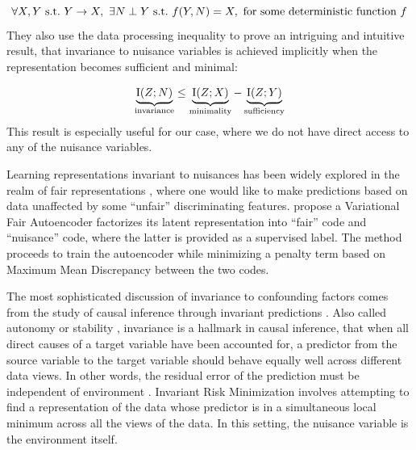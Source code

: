 \documentclass[../thesis.tex]{subfiles}
\begin{document}
\begin{equation}
    \forall \myrv{x}, \myrv{y} ~ \text{s.t.} ~ \myrv{y} \to \myrv{x}, ~ \exists \myrv{n} \perp \myrv{y} ~ \text{s.t.} ~ f(\myrv{y}, \myrv{n}) = \myrv{x}, ~ \text{for some deterministic function} ~ f
\end{equation}
They also use the data processing inequality \citep{cover1999elements} to prove an intriguing and intuitive result, that invariance to nuisance variables is achieved implicitly when the representation becomes sufficient and minimal:

\begin{equation}
    \underbrace{\mathrm{I}(\myrv{z}; \myrv{n})}_{\text{invariance}} \leq \underbrace{\mathrm{I}(\myrv{z}; \myrv{x})}_{\text{minimality}} - \underbrace{\mathrm{I}(\myrv{z}; \myrv{y})}_{\text{sufficiency}}
\end{equation}
This result is especially useful for our case, where we do not have direct access to any of the nuisance variables.

Learning representations invariant to nuisances has been widely explored in the realm of fair representations \citep{zemel2013learning, hardt2016equality, louizos2016variational}, where one would like to make predictions based on data unaffected by some ``unfair'' discriminating features. \citet{louizos2016variational} propose a Variational Fair Autoencoder factorizes its latent representation into ``fair'' code and ``nuisance'' code, where the latter is provided as a supervised label. The method proceeds to train the autoencoder while minimizing a penalty term based on Maximum Mean Discrepancy \citep{gretton2007kernel} between the two codes.

The most sophisticated discussion of invariance to confounding factors comes from the study of causal inference through invariant predictions \citep{petersCausalInferenceUsing2016,arjovskyInvariantRiskMinimization2019}. Also called autonomy or stability \citep{pearl2009causality}, invariance is a hallmark in causal inference, that when all direct causes of a target variable have been accounted for, a predictor from the source variable to the target variable should behave equally well across different data views. In other words, the residual error of the prediction must be independent of environment \citep{magliacane2018domain}. Invariant Risk Minimization \citep{arjovskyInvariantRiskMinimization2019} involves attempting to find a representation of the data whose predictor is in a simultaneous local minimum across all the views of the data. In this setting, the nuisance variable is the environment itself.
\end{document}
